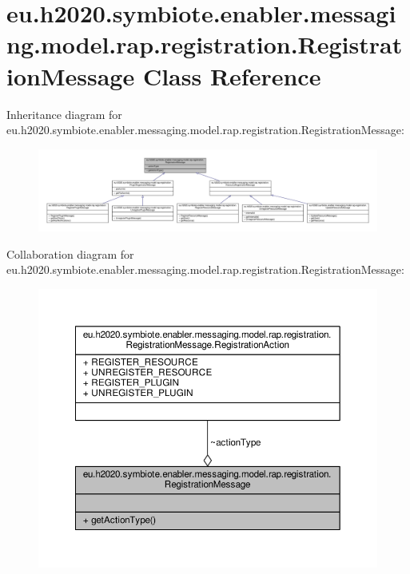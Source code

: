 \hypertarget{classeu_1_1h2020_1_1symbiote_1_1enabler_1_1messaging_1_1model_1_1rap_1_1registration_1_1RegistrationMessage}{}\section{eu.\+h2020.\+symbiote.\+enabler.\+messaging.\+model.\+rap.\+registration.\+Registration\+Message Class Reference}
\label{classeu_1_1h2020_1_1symbiote_1_1enabler_1_1messaging_1_1model_1_1rap_1_1registration_1_1RegistrationMessage}


Inheritance diagram for eu.\+h2020.\+symbiote.\+enabler.\+messaging.\+model.\+rap.\+registration.\+Registration\+Message\+:
\nopagebreak
\begin{figure}[H]
\begin{center}
\leavevmode
\includegraphics[width=350pt]{classeu_1_1h2020_1_1symbiote_1_1enabler_1_1messaging_1_1model_1_1rap_1_1registration_1_1RegistrationMessage__inherit__graph}
\end{center}
\end{figure}


Collaboration diagram for eu.\+h2020.\+symbiote.\+enabler.\+messaging.\+model.\+rap.\+registration.\+Registration\+Message\+:
\nopagebreak
\begin{figure}[H]
\begin{center}
\leavevmode
\includegraphics[width=350pt]{classeu_1_1h2020_1_1symbiote_1_1enabler_1_1messaging_1_1model_1_1rap_1_1registration_1_1RegistrationMessage__coll__graph}
\end{center}
\end{figure}
